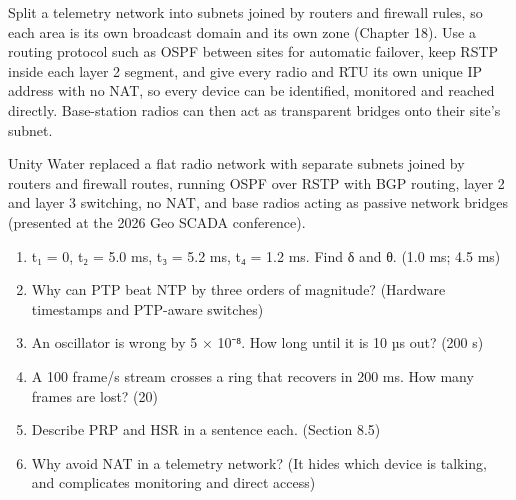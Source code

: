  Split a telemetry network into subnets joined by routers and firewall rules, so each area is its own broadcast domain and its own zone (Chapter 18). Use a routing protocol such as OSPF between sites for automatic failover, keep RSTP inside each layer 2 segment, and give every radio and RTU its own unique IP address with no NAT, so every device can be identified, monitored and reached directly. Base-station radios can then act as transparent bridges onto their site's subnet.

 Unity Water replaced a flat radio network with separate subnets joined by routers and firewall routes, running OSPF over RSTP with BGP routing, layer 2 and layer 3 switching, no NAT, and base radios acting as passive network bridges (presented at the 2026 Geo SCADA conference).

\begin{enumerate}
\item t₁ = 0, t₂ = 5.0 ms, t₃ = 5.2 ms, t₄ = 1.2 ms. Find δ and θ. (1.0 ms; 4.5 ms)
\item Why can PTP beat NTP by three orders of magnitude? (Hardware timestamps and PTP-aware switches)
\item An oscillator is wrong by 5 × 10⁻⁸. How long until it is 10 µs out? (200 s)
\item A 100 frame/s stream crosses a ring that recovers in 200 ms. How many frames are lost? (20)
\item Describe PRP and HSR in a sentence each. (Section 8.5)
\item Why avoid NAT in a telemetry network? (It hides which device is talking, and complicates monitoring and direct access)
\end{enumerate}
